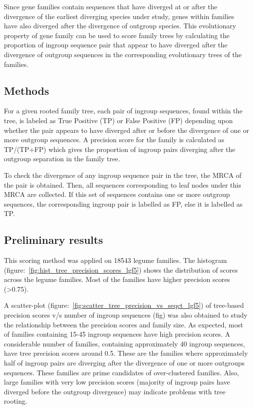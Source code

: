 \documentclass{article}
\begin{document}
	Since gene families contain sequences that have diverged at or after the divergence of the earliest diverging species under study, genes within families have also diverged after the divergence of outgroup species. This evolutionary property of gene family can be used to score family trees by calculating the proportion of ingroup sequence pair that appear to have diverged after the divergence of outgroup sequences in the corresponding evolutionary trees of the families.
		\subsection{Methods}
		For a given rooted family tree, each pair of ingroup sequences, found within the tree, is labeled as True Positive (TP) or False Positive (FP) depending upon whether the pair appears to have diverged after or before the divergence of one or more outgroup sequences. A precision score for the family is calculated  as TP/(TP+FP) which gives the proportion of ingroup pairs diverging after the outgroup separation in the family tree.
		
		To check the divergence of any ingroup sequence pair in the tree, the MRCA of the pair is obtained. Then, all sequences corresponding to leaf nodes under this MRCA are collected. If this set of sequences contains one or more outgroup sequences, the corresponding ingroup pair is labelled as FP, else it is labelled as TP.
		
		\subsection{Preliminary results}
		This scoring method was applied on 18543 legume families. The histogram (figure:~\ref{fig:hist_tree_precision_scores_lgf5}) shows the distribution of scores across the legume families. Most of the families have higher precision scores (>0.75).
		
		A scatter-plot (figure:~\ref{fig:scatter_tree_precision_vs_seqct_lgf5}) of tree-based precision scores v/s number of ingroup sequences (fig) was also obtained to study the relationship between the precision scores and family size. As expected, most of families containing 15-45 ingroup sequences  have high precision scores. A considerable number of families, containing approximately 40 ingroup sequences, have tree precision scores around 0.5. These are the families where approximately half of ingroup pairs are diverging after the divergence of one or more outgroups sequences. These families are prime candidates of over-clustered families. Also, large families with very low precision scores (majority of ingroup pairs have diverged before the outgroup divergence) may indicate problems with tree rooting.
		
\end{document}
